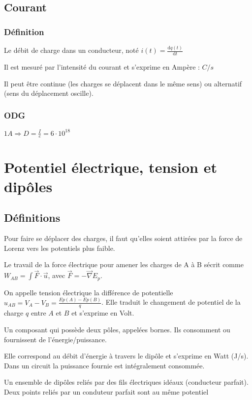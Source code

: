 \documentclass[french]{yLectureNote}
\renewcommand{\vec}{\overrightarrow}
\begin{document}
\subsection{Courant}
\subsubsection{Définition}
\begin{definition}[Courant]
Le débit de charge dans un conducteur, noté $i(t) = \frac{\mathrm{d} q(t)}{\mathrm{d}t}$
\end{definition}
Il est mesuré par l'intensité du courant et s'exprime en Ampère : $C/s$

Il peut \^etre continue (les charges se déplacent dans le m\^eme sens) ou alternatif (sens du déplacement oscille).
\subsubsection{ODG}
\(1A \Rightarrow D = \frac{I}{e} = 6\cdot 10^{18} \)
\section{Potentiel électrique, tension et dip\^oles}
\subsection{Définitions}
Pour faire se déplacer des charges, il faut qu'elles soient attirées par la force de Lorenz vers les potentiels plus faible.

Le travail de la force électrique pour amener les charges de A à B sécrit comme \(W_{AB} = \int \vec{F}\cdot \vec{u}\), avec \(\vec{F} = - \vec{\nabla} E_p\).
\begin{definition}

On appelle tension électrique la différence de potentielle \(u_{AB} = V_A - V_B = \frac{Ep(A)-Ep(B)}{q}\). Elle traduit le changement de potentiel de la charge $q$ entre $A$ et $B$ et s'exprime en Volt.
\end{definition}
\begin{definition}
Un composant qui possède deux p\^oles, appelées bornes. Ils consomment ou fournissent de l'énergie/puissance.
\end{definition}
\begin{definition}[Puissance]
Elle correspond au débit d'énergie à travers le dip\^ole et s'exprime en Watt (J/s). Dans un circuit la puissance fournie est intégralement consommée.
\end{definition}
\begin{definition}[Circuit]
Un ensemble de dip\^oles reliés par des fils électriques idéaux (conducteur parfait). Deux points reliés par un conduteur parfait sont au m\^eme potentiel
\end{definition}
\end{document}
